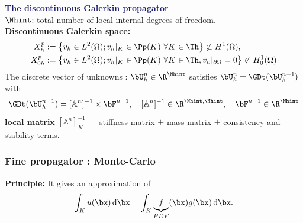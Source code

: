 \documentclass[10 pt]{beamer}
\begin{document}
%
\begin{frame}
  \textcolor{midnightblue}{\textbf{The discontinuous Galerkin propagator}}
  \\
  \vspace*{0.2 cm}
  $\Nhint$:  total number of local internal degrees of freedom.
  \\
  \vspace*{0.2 cm}
  \textcolor{cadmiumgreen}{\textbf{Discontinuous Galerkin space:}}
  \begin{equation*}
    \begin{split}
      X_h^p & := \left\{v_h \in L^2(\Omega); v_h|_{K} \in \Pp(K) \ \forall K \in \Th  \right\} \not \subset H^1(\Omega),\\
X_{0h}^p & := \left\{v_h \in L^2(\Omega); v_h|_{K} \in \Pp(K) \ \forall K \in \Th, v_h|_{\partial \Omega} = 0  \right\} \not \subset H_0^1(\Omega)
    \end{split}
  \end{equation*}
  The discrete vector of unknowns : $\bU_h^n \in \R^{\Nhint}$ satisfies $\bU_h^n = \GDt(\bU_h^{n-1})$ with
  \begin{equation*}
    \GDt(\bU_h^{n-1}) = [\mathbb{A}^n]^{-1}  \times \bF^{n-1}, \quad [\mathbb{A}^n]^{-1} \in \R^{\Nhint,\Nhint}, \quad \bF^{n-1} \in \R^{\Nhint}
  \end{equation*}
  \textcolor{cadmiumgreen}{\textbf{local matrix}} $[\mathbb{A}^n]^{-1}_K = $ stiffness matrix $+$ mass matrix $+$ consistency and stability terms.
\end{frame}
%
\begin{frame}
  \frametitle{Fine propagator : Monte-Carlo}
  \textcolor{cadmiumgreen}{\textbf{Principle:}}
  It gives an approximation of
  \begin{equation*}
    \int_K u(\bx)\,\mathrm{d}\bx = \int_K \underbrace{f}_{PDF}(\bx) g(\bx)\,\mathrm{d}\bx.
  \end{equation*}
\end{frame}
\end{document}
